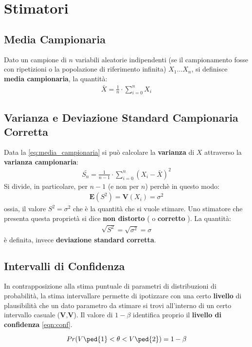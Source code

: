   \chapter{Stimatori}
  \section{Media Campionaria}
	Dato un campione di $n$ variabili aleatorie indipendenti (se il campionamento fosse con ripetizioni o la popolazione di riferimento infinita) $ X_1 \ldots X_n $, si definisce \textbf{media campionaria}, la quantità:
	\begin{equation}
	\label{eq:media_campionaria}
	\begin{split}
		\bar{X} = \frac{1}{n} \cdot \sum_{i=0}^n X_i
	\end{split}
	\end{equation}	    

  \section{Varianza e Deviazione Standard Campionaria Corretta}
  Data la \ref{eq:media_campionaria} si può calcolare la \textbf{varianza} di $X$ attraverso la \textbf{varianza campionaria}: 
	\begin{equation}
	\label{eq:varianza_campionaria}
	\begin{split}
		\bar{S_n} = \frac{1}{n-1} \cdot \sum_{i=0}^n (X_i-\bar{X})^2
	\end{split}
	\end{equation}	      
  Si divide, in particolare, per $n-1$ (e non per $n$) perchè in questo modo:
	\begin{equation}
	\label{eq:stimatore_varianza_corretto}
	\begin{split}
		\mathbf{E}(S^2) = \mathbf{V}(X_i) = \sigma^2
	\end{split}
	\end{equation}	
  ossia, il valore $S^2 = \sigma^2$ che è la quantità che si vuole stimare.
  Uno stimatore che presenta questa proprietà si dice \textbf{non distorto} ( o \textbf{corretto} ).
  La quantità:
	\begin{equation}
	\label{eq:deviazione_standard_corretta}
	\begin{split}
		\sqrt{S^2} = \sqrt{\sigma^2} = \sigma
	\end{split}
	\end{equation}
  è definita, invece \textbf{deviazione standard corretta}.
  \section{Intervalli di Confidenza}   
  In contrapposizione alla stima puntuale di parametri di distribuzioni di probabilità, la stima intervallare permette di ipotizzare    con una certo \textbf{livello} di plausibilità che un dato parametro da stimare si trovi all'interno di un certo intervallo casuale (\textbf{V},\textbf{V}). Il valore di $1-\beta$ identifica proprio il \textbf{livello di confidenza} \eqref{eqn:conf}.
  
\begin{equation}
\label{eqn:conf}
Pr(V\ped{1} < \theta < V\ped{2}) = 1-\beta
\end{equation}    
